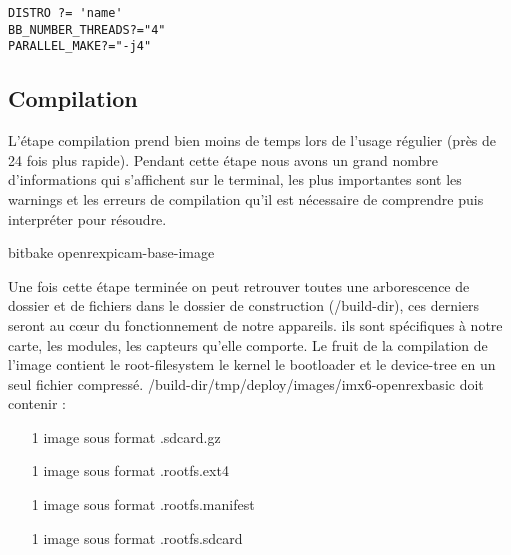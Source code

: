 \begin{lstlisting}
DISTRO ?= 'name'
BB_NUMBER_THREADS?="4"
PARALLEL_MAKE?="-j4"
\end{lstlisting}
\subsection{Compilation}

L’étape compilation prend bien moins de temps lors de l’usage régulier (près
de 24 fois plus rapide). Pendant cette étape nous avons un grand nombre
d’informations qui s’affichent sur le terminal, les plus importantes sont les
warnings et les erreurs de compilation qu’il est nécessaire de comprendre puis
interpréter pour résoudre.

\begin{tcolorbox}
	bitbake openrexpicam-base-image
\end{tcolorbox}

Une fois cette étape terminée on peut retrouver toutes une arborescence de dossier et de fichiers dans le dossier de construction (/build-dir), ces derniers seront au cœur du fonctionnement de notre appareils. ils sont spécifiques à notre carte, les modules, les capteurs qu’elle comporte. Le fruit de la compilation de l’image contient le root-filesystem le kernel le bootloader et le device-tree en un seul fichier compressé. /build-dir/tmp/deploy/images/imx6-openrexbasic doit contenir :

\begin{itemize}
	\item[1 image sous format] .sdcard.gz
	\item[1 image sous format] .rootfs.ext4
	\item[1 image sous format] .rootfs.manifest
	\item[1 image sous format] .rootfs.sdcard
\end{itemize}
